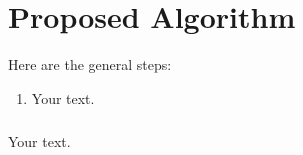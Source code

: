 \chapter{Proposed Algorithm}

Here are the general steps:
\begin{enumerate}
\item Your text.
\end{enumerate}
\paragraph{} Your text.
\paragraph{}
